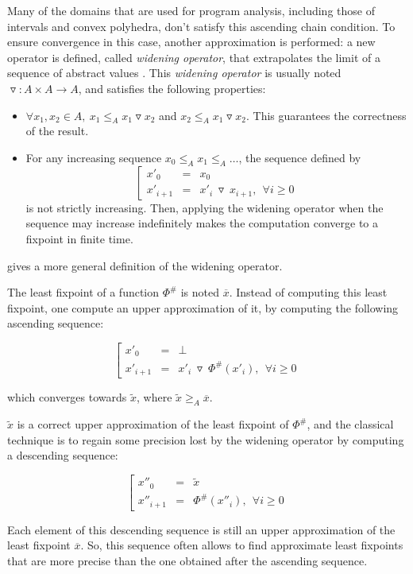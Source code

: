 \documentclass[a4paper,english,titlepage,11pt]{report}
\newcommand*\system[1]{\left[ \begin{array}{lllll}#1 \end{array}\right.}
\newcommand{\widening}{\mathop{\triangledown}}
\begin{document}
Many of the domains that are used for program analysis, including those of intervals and convex polyhedra, don't satisfy this ascending chain condition. To ensure convergence in this case, another approximation
is performed: a new operator is defined, called \emph{widening operator}, that
extrapolates the limit of a sequence of abstract values
\cite{CC77,CousotCousot92-4}. This \emph{widening
operator} is usually noted $\widening: A \times A \rightarrow A$, and satisfies
the following properties:

\begin{itemize}
\item $\forall x_1, x_2 \in A,\ x_1 \leq_A x_1 \widening x_2$ and $x_2 \leq_A x_1
\widening x_2$. This guarantees the correctness of the result.
\item For any increasing sequence $x_0 \leq_A x_1 \leq_A \dots$, the sequence
defined by 
$$\system{
x'_0 & = &  x_0 \\
x'_{i+1} & = &  x'_i\ \widening\ x_{i+1},\ \  \forall i \geq 0
}$$
is not strictly increasing. Then, applying the widening operator when the
sequence may increase indefinitely makes the computation converge to a fixpoint
in finite time. 
\end{itemize}

\cite{Monniaux_HOSC09} gives a more general definition of the widening operator.

The least fixpoint of a function $\Phi^\#$ is noted $\overline{x}$.
Instead of computing this least fixpoint,
one compute an upper approximation of it, by computing the following ascending
sequence:

$$\system{
x'_0 &=& \perp \\
x'_{i+1} &=& x'_i\ \widening\ \Phi^\#(x'_i),\ \ \forall i \geq 0
}$$

which converges towards $\tilde{x}$, where $\tilde{x} \geq_A \overline{x}$.

$\tilde{x}$ is a correct upper approximation of the least fixpoint of $\Phi^\#$,
and the classical technique is to regain some precision lost by the widening
operator by computing a descending sequence:

$$\system{
x''_0 &=& \tilde{x} \\
x''_{i+1} &=& \Phi^\#(x''_i), \ \ \forall i \geq 0
}$$

Each element of this descending sequence is still an upper approximation of the
least fixpoint $\overline{x}$. So, this sequence often allows to find
approximate least fixpoints that are more precise than the one obtained after
the ascending sequence.
\end{document}
